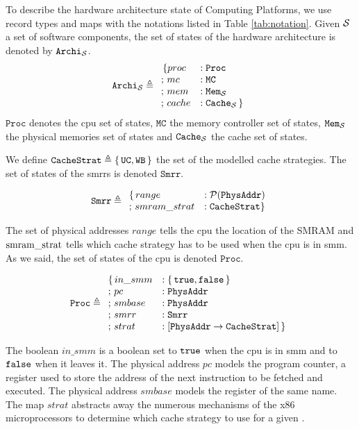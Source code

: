 To describe the hardware architecture state of  Computing
Platforms, we use record types and maps with the notations listed in Table
\ref{tab:notation}.
%
Given $\mathcal{S}$ a set of software components, the set of states of the hardware
architecture is denoted by $\texttt{Archi}_{\mathcal{S}}$.
%
\[
  \texttt{Archi}_{\mathcal{S}} \triangleq
  \begin{array}{ll}
    \,\{proc &: \texttt{Proc}          \\
    ;\,mc    &: \texttt{MC}            \\
    ;\,mem   &: \texttt{Mem}_{\mathcal{S}} \\
    ;\,cache &: \texttt{Cache}_{\mathcal{S}}\,\}
  \end{array}
\]
%
$\texttt{Proc}$ denotes the \ac{cpu} set of states, $\texttt{MC}$ the memory
controller set of states, $\texttt{Mem}_{\mathcal{S}}$ the physical memories set of
states and $\texttt{Cache}_{\mathcal{S}}$ the cache set of states.

We define $\texttt{CacheStrat} \triangleq \{\,\mathtt{UC}, \mathtt{WB}\,\}$ the
set of the modelled cache strategies.
%
The set of states of the \ac{smrr}s is denoted $\texttt{Smrr}$.

\[ \texttt{Smrr} \triangleq
  \begin{array}{ll}
    \{\,range &: \mathcal{P}(\texttt{PhysAddr}) \\
    ;\,smram\_strat &: \texttt{CacheStrat} \}
  \end{array}
\]

The set of physical addresses $range$ tells the \ac{cpu} the location of the
SMRAM and $\mathrm{smram\_strat}$ tells which cache strategy has to be used when
the \ac{cpu} is in \ac{smm}.
%
As we said, the set of states of the \ac{cpu} is denoted $\texttt{Proc}$.

\[
  \texttt{Proc} \triangleq
  \begin{array}{ll}
    \{\,in\_smm &: \{\,\mathtt{true}, \mathtt{false}\,\} \\
    ;\,pc &: \texttt{PhysAddr} \\
    ;\,smbase &: \texttt{PhysAddr} \\
    ;\,smrr &: \texttt{Smrr} \\
    ;\,strat &: [ \texttt{PhysAddr} \rightarrow \texttt{CacheStrat}]\,\}
  \end{array}
\]

The boolean $in\_smm$ is a boolean set to $\mathtt{true}$ when the \ac{cpu} is in
\ac{smm} and to $\mathtt{false}$ when it leaves it.
%
The physical address $pc$ models the program counter, a register used to store
the address of the next instruction to be fetched and executed.
%
The physical address $smbase$ models the register of the same name.
%
The map $strat$ abstracts away the numerous mechanisms of the x86
microprocessors to determine which cache strategy to use for a given \IO.


